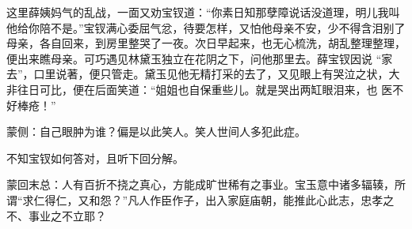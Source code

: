 \begin{parag}
    这里薛姨妈气的乱战，一面又劝宝钗道：“你素日知那孽障说话没道理，明儿我叫他给你陪不是。”宝钗满心委屈气忿，待要怎样，又怕他母亲不安，少不得含泪别了母亲，各自回来，到房里整哭了一夜。次日早起来，也无心梳洗，胡乱整理整理，便出来瞧母亲。可巧遇见林黛玉独立在花阴之下，问他那里去。薛宝钗因说 “家去”，口里说著，便只管走。黛玉见他无精打采的去了，又见眼上有哭泣之状，大非往日可比，便在后面笑道：“姐姐也自保重些儿。就是哭出两缸眼泪来，也 医不好棒疮！”\begin{note}蒙侧：自己眼肿为谁？偏是以此笑人。笑人世间人多犯此症。\end{note}不知宝钗如何答对，且听下回分解。
\end{parag}


\begin{parag}
    \begin{note}蒙回末总：人有百折不挠之真心，方能成旷世稀有之事业。宝玉意中诸多辐辏，所谓“求仁得仁，又和怨？”凡人作臣作子，出入家庭庙朝，能推此心此志，忠孝之不、事业之不立耶？\end{note}
\end{parag}

